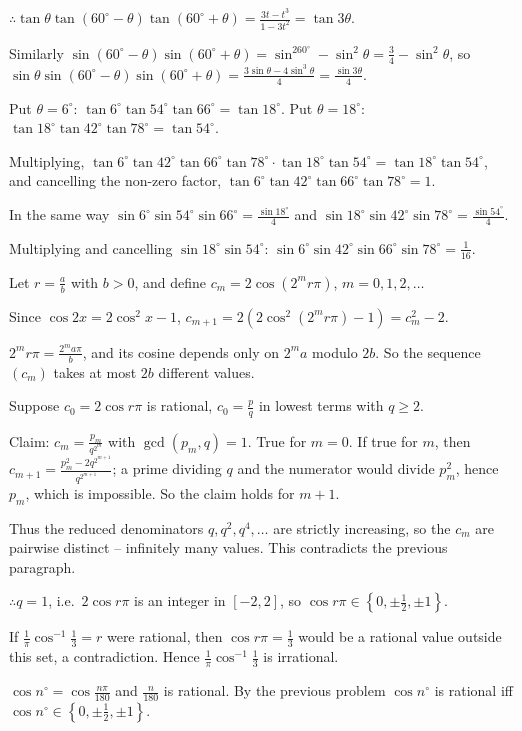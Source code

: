   $\therefore \tan\theta\tan(60^\circ - \theta)\tan(60^\circ + \theta) = \frac{3t - t^3}{1 - 3t^2} = \tan3\theta$.

  Similarly $\sin(60^\circ - \theta)\sin(60^\circ + \theta) = \sin^260^\circ - \sin^2\theta = \frac{3}{4}
  - \sin^2\theta$, so $\sin\theta\sin(60^\circ - \theta)\sin(60^\circ + \theta) = \frac{3\sin\theta -
    4\sin^3\theta}{4} = \frac{\sin3\theta}{4}$.

  Put $\theta = 6^\circ$: $\tan6^\circ\tan54^\circ\tan66^\circ = \tan18^\circ$. Put $\theta = 18^\circ$:
  $\tan18^\circ\tan42^\circ\tan78^\circ = \tan54^\circ$.

  Multiplying, $\tan6^\circ\tan42^\circ\tan66^\circ\tan78^\circ\cdot\tan18^\circ\tan54^\circ =
  \tan18^\circ\tan54^\circ$, and cancelling the non-zero factor, $\tan6^\circ\tan42^\circ\tan66^\circ\tan78^\circ
  = 1$.

  In the same way $\sin6^\circ\sin54^\circ\sin66^\circ = \frac{\sin18^\circ}{4}$ and
  $\sin18^\circ\sin42^\circ\sin78^\circ = \frac{\sin54^\circ}{4}$.

  Multiplying and cancelling $\sin18^\circ\sin54^\circ$: $\sin6^\circ\sin42^\circ\sin66^\circ\sin78^\circ
  = \frac{1}{16}$.
\item Let $r = \frac{a}{b}$ with $b > 0$, and define $c_m = 2\cos(2^mr\pi)$, $m = 0, 1, 2, \ldots$

  Since $\cos2x = 2\cos^2x - 1$, $c_{m + 1} = 2(2\cos^2(2^mr\pi) - 1) = c_m^2 - 2$.

  $2^mr\pi = \frac{2^ma\pi}{b}$, and its cosine depends only on $2^ma$ modulo $2b$. So the sequence $(c_m)$ takes
  at most $2b$ different values.

  Suppose $c_0 = 2\cos r\pi$ is rational, $c_0 = \frac{p}{q}$ in lowest terms with $q\geq 2$.

  Claim: $c_m = \frac{p_m}{q^{2^m}}$ with $\gcd(p_m, q) = 1$. True for $m = 0$. If true for $m$, then $c_{m + 1}
  = \frac{p_m^2 - 2q^{2^{m + 1}}}{q^{2^{m + 1}}}$; a prime dividing $q$ and the numerator would divide $p_m^2$, hence
  $p_m$, which is impossible. So the claim holds for $m + 1$.

  Thus the reduced denominators $q, q^2, q^4, \ldots$ are strictly increasing, so the $c_m$ are pairwise distinct
  -- infinitely many values. This contradicts the previous paragraph.

  $\therefore q = 1$, i.e.\ $2\cos r\pi$ is an integer in $[-2, 2]$, so $\cos r\pi\in\left\{0, \pm\frac{1}{2},
  \pm1\right\}$.

  If $\frac{1}{\pi}\cos^{-1}\frac{1}{3} = r$ were rational, then $\cos r\pi = \frac{1}{3}$ would be a rational value
  outside this set, a contradiction. Hence $\frac{1}{\pi}\cos^{-1}\frac{1}{3}$ is irrational.
\item $\cos n^\circ = \cos\frac{n\pi}{180}$ and $\frac{n}{180}$ is rational. By the previous problem $\cos
  n^\circ$ is rational iff $\cos n^\circ\in\left\{0, \pm\frac{1}{2}, \pm1\right\}$.

